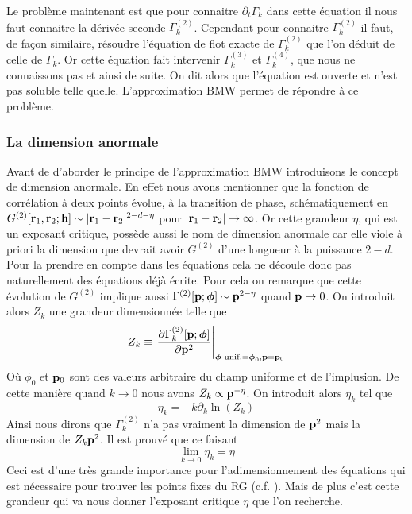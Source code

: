 \documentclass[10pt]{article}
\begin{document}
\begin{multicols}{2}
Le problème maintenant est que pour connaitre $\partial_t \Gamma_k$ dans cette équation il nous faut connaitre la dérivée seconde $\Gamma_k^{(2)}$. Cependant pour connaitre $\Gamma_k^{(2)}$ il faut, de façon similaire, résoudre l'équation de flot exacte de $\Gamma_k^{(2)}$ que l'on déduit de celle de $\Gamma_k$. Or cette équation fait intervenir $\Gamma_k^{(3)}$ et $\Gamma_k^{(4)}$, que nous ne connaissons pas et ainsi de suite. On dit alors que l'équation est ouverte et n'est pas soluble telle quelle. L'approximation BMW permet de répondre à ce problème. \\


\vspace*{11pt}
\subsubsection{La dimension anormale}

\label{sec:DimAnorm}

Avant de d'aborder le principe de l'approximation BMW introduisons le concept de dimension anormale. En effet nous avons mentionner que la fonction de corrélation à deux points évolue, à la transition de phase, schématiquement en $G^{(2)}[{\bf r}_1, {\bf r}_2; {\bf h}] \sim |{\bf r}_1 - {\bf r}_2|^{2-d-\eta}$ pour $|{\bf r}_1 - {\bf r}_2| \to \infty$. Or cette grandeur $\eta$, qui est un exposant critique, possède aussi le nom de dimension anormale car elle viole à priori la dimension que devrait avoir $G^{(2)}$ d'une longueur à la puissance $2-d$. Pour la prendre en compte dans les équations cela ne découle donc pas naturellement des équations déjà écrite. Pour cela on remarque que cette évolution de $G^{(2)}$ implique aussi $\Gamma^{(2)}[{\bf p}; \boldsymbol{ \phi}] \sim {\bf p}^{2-\eta}$ quand ${\bf p} \to 0$. On introduit alors $Z_k$ une grandeur dimensionnée telle que
\begin{equation}
	Z_k \equiv {\left. \frac{\partial \Gamma_k^{(2)}[{\bf p};\boldsymbol{ \phi}]}{\partial {\bf p}^2} \right|}_{\boldsymbol{ \phi} \text{ unif.} = \boldsymbol{ \phi}_0, {\bf p} = {\bf p}_0 }
	\label{eq:defZk}
\end{equation}
Où $\phi_0$ et ${\bf p}_0$ sont des valeurs arbitraire du champ uniforme et de l'implusion. De cette manière  quand $k \to 0$ nous avons $Z_k \propto {\bf p}^{-\eta}$.
On introduit alors $\eta_k$ tel que
\begin{equation}
	\eta_k = -k \partial_k \ln(Z_k)
\end{equation}
Ainsi nous dirons que $\Gamma^{(2)}_k$ n'a pas vraiment la dimension de ${\bf p}^2$ mais la dimension de $Z_k{\bf p}^2$. Il est prouvé \cite{} que ce faisant 
\begin{equation}
 	\lim\limits_{k \to 0} \eta_k  = \eta
 \end{equation}
Ceci est d'une très grande importance pour l'adimensionnement des équations qui est nécessaire pour trouver les points fixes du RG (c.f. ). Mais de plus c'est cette grandeur qui va nous donner l'exposant critique $\eta$ que l'on recherche.



\end{multicols}
\end{document}
